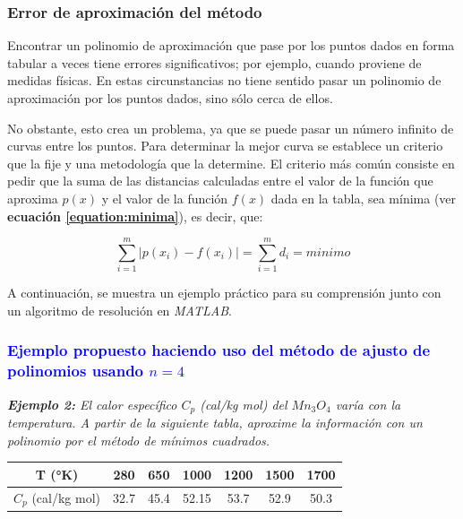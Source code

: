 \documentclass[11pt,letterpaper]{article}
\begin{document}
\subsubsection{Error de aproximación del método}
Encontrar un polinomio de aproximación que pase por los puntos dados en forma tabular a veces tiene errores significativos; por ejemplo, cuando proviene de medidas físicas. En estas circunstancias no tiene sentido pasar un polinomio de aproximación por los puntos dados, sino sólo cerca de ellos.\par
No obstante, esto crea un problema, ya que se puede pasar un número infinito de curvas entre los puntos. Para determinar la mejor curva se establece un criterio que la fije y una metodología que la determine. \cite{binomiosScribd} El criterio más común consiste en pedir que la suma de las distancias calculadas entre el valor de la función que aproxima $p(x)$ y el valor de la función $f(x)$ dada en la tabla, sea mínima (ver \textbf{ecuación \ref{equation:minima}}), es decir, que:

\begin{equation}\label{equation:minimo}
\sum_{i=1}^m | p(x_i) - f(x_i) | = \sum_{i=1}^m d_i = minimo
\end{equation}

\par
A continuación, se muestra un ejemplo práctico para su comprensión junto con un algoritmo de resolución en \textit{MATLAB}.

\subsubsection*{\textcolor{Blue}{Ejemplo propuesto haciendo uso del método de ajusto de polinomios usando $n=4$}}
\begin{center}
\textit{\textbf{Ejemplo 2:} El calor específico $C_p$ (cal/kg mol) del $Mn_3O_4$ varía con la temperatura. A partir de la siguiente tabla, aproxime la información con un polinomio por el método de mínimos cuadrados.} \cite{nieves2011metodos}
\linebreak \par
	\begin{tabular}{c|c c c c c c}
	\hline 
	T (°K) & 280 & 650 & 1000 & 1200 & 1500 & 1700 \\ \hline
	$C_p$ (cal/kg mol) & 32.7 & 45.4 & 52.15 & 53.7 & 52.9 & 50.3 \\ 
	\hline 
	\end{tabular} 
\end{center}
\end{document}
